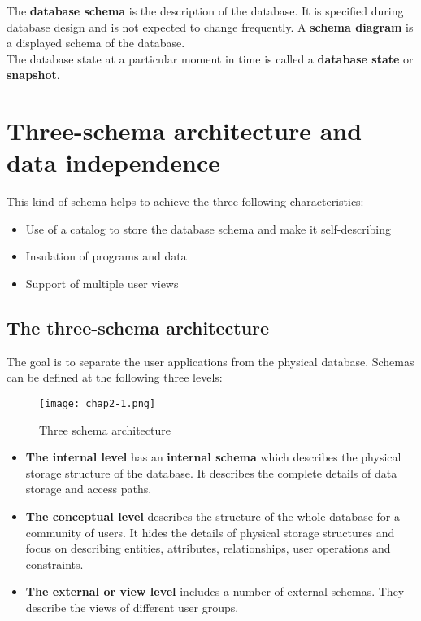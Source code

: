 The \textbf{database schema} is the description of the database. It is specified during database design and is not expected to change frequently. A \textbf{schema diagram} is a displayed schema of the database.\\

The database state at a particular moment in time is called a \textbf{database state} or \textbf{snapshot}. 

\section{Three-schema architecture and data independence}

This kind of schema helps to achieve the three following characteristics:\\

\begin{itemize}
    \item Use of a catalog to store the database schema and make it self-describing
    \item Insulation of programs and data
    \item Support of multiple user views
\end{itemize}

\subsection{The three-schema architecture}

The goal is to separate the user applications from the physical database. Schemas can be defined at the following three levels:\\

\begin{figure}[!h]
    \centering
    \texttt{[image: chap2-1.png]}
    \caption{Three schema architecture}
    \label{fig:architecture-2}
\end{figure}

\begin{itemize}
    \item \textbf{The internal level} has an \textbf{internal schema} which describes the physical storage structure of the database. It describes the complete details of data storage and access paths.
    \item \textbf{The conceptual level} describes the structure of the whole database for a community of users. It hides the details of physical storage structures and focus on describing entities, attributes, relationships, user operations and constraints.
    \item \textbf{The external or view level} includes a number of external schemas. They describe the views of different user groups.
\end{itemize}

